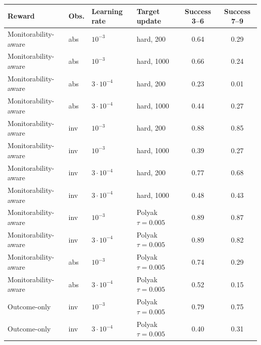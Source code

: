 \begin{tabular}{llllcc}
\toprule
Reward & Obs. & Learning rate & Target update & Success 3--6 & Success 7--9 \\
\midrule
Monitorability-aware & abs & $10^{-3}$ & hard, 200 & 0.64 & 0.29 \\
Monitorability-aware & abs & $10^{-3}$ & hard, 1000 & 0.66 & 0.24 \\
Monitorability-aware & abs & $3{\cdot}10^{-4}$ & hard, 200 & 0.23 & 0.01 \\
Monitorability-aware & abs & $3{\cdot}10^{-4}$ & hard, 1000 & 0.44 & 0.27 \\
Monitorability-aware & inv & $10^{-3}$ & hard, 200 & 0.88 & 0.85 \\
Monitorability-aware & inv & $10^{-3}$ & hard, 1000 & 0.39 & 0.27 \\
Monitorability-aware & inv & $3{\cdot}10^{-4}$ & hard, 200 & 0.77 & 0.68 \\
Monitorability-aware & inv & $3{\cdot}10^{-4}$ & hard, 1000 & 0.48 & 0.43 \\
Monitorability-aware & inv & $10^{-3}$ & Polyak $\tau{=}0.005$ & 0.89 & 0.87 \\
Monitorability-aware & inv & $3{\cdot}10^{-4}$ & Polyak $\tau{=}0.005$ & 0.89 & 0.82 \\
Monitorability-aware & abs & $10^{-3}$ & Polyak $\tau{=}0.005$ & 0.74 & 0.29 \\
Monitorability-aware & abs & $3{\cdot}10^{-4}$ & Polyak $\tau{=}0.005$ & 0.52 & 0.15 \\
Outcome-only & inv & $10^{-3}$ & Polyak $\tau{=}0.005$ & 0.79 & 0.75 \\
Outcome-only & inv & $3{\cdot}10^{-4}$ & Polyak $\tau{=}0.005$ & 0.40 & 0.31 \\
\bottomrule
\end{tabular}
